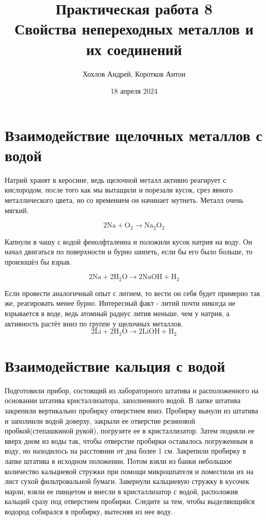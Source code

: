 \documentclass[a4paper,12pt]{article}
\author{Хохлов Андрей, Коротков Антон}
\title{Практическая работа 8\\
	\textbf{Свойства непереходных металлов и их соединений}}
\date{18 апреля 2024}
\begin{document}
	
	{\Large \maketitle}
\section{Взаимодействие щелочных металлов с водой}
Натрий хранят в керосине, ведь щелочной металл активно реагирует с кислородом, после того как мы вытащили и порезали кусок, срез явного металлического цвета, но со времением он начинает мутнеть. Металл очень мягкий.
  
\begin{equation} 
\mathrm{2Na + O_2 \longrightarrow Na_2O_2  } 
\end{equation}

Капнули в чашу с водой фенолфталеина и положили кусок натрия на воду. Он начал двигаться по поверхности и бурно шипеть, если бы его было больше, то произошёл бы взрыв.

\begin{equation} 
\mathrm{2Na + 2H_2O \longrightarrow 2NaOH + H_2 } 
\end{equation}

Если провести аналогичный опыт с литием,  то вести он себя будет примерно так же, реагировать менее бурно. Интересный факт - литий почти никогда не взрывается в воде, ведь атомный радиус лития меньше, чем у натрия, а активность растёт вниз по группе у щелочных металлов.
\begin{equation} 
\mathrm{2Li + 2H_2O \longrightarrow 2LiOH + H_2 } 
\end{equation}
\section{Взаимодействие кальция с водой}
Подготовили прибор, состоящий из лабораторного штатива и расположенного на основании
штатива кристаллизатора, заполненного водой. В лапке штатива закрепили вертикально пробирку
отверстием вниз. Пробирку вынули из штатива и заполнили водой
доверху, закрыли ее отверстие резиновой пробкой(степашкиной рукой), погрузите ее в кристаллизатор. Затем
подняли ее вверх дном из воды так, чтобы отверстие пробирки оставалось погруженным в воду,
но находилось на расстоянии от дна более 1 см. Закрепили пробирку в лапке штатива в исходном
положении. 
Потом взяли из банки небольшое количество кальциевой стружки при помощи
микрошпателя и поместили их на лист сухой фильтровальной бумаги. Завернули кальциевую
стружку в кусочек марли, взяли ее пинцетом и внесли в кристаллизатор с водой, расположив
кальций сразу под отверстием пробирки.  Следите за тем, чтобы выделяющийся водород собирался в пробирку, вытесняя из нее воду.
\end{document}
